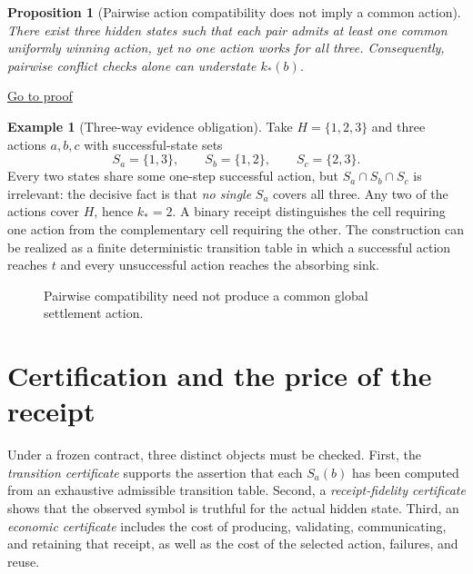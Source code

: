 \documentclass[11pt,letterpaper]{article}
\newtheorem{proposition}[theorem]{Proposition}
\theoremstyle{definition}
\newtheorem{example}[theorem]{Example}
\theoremstyle{remark}
\newcommand{\backproof}[1]{\hfill\hyperlink{proof:#1}{\footnotesize Go to proof}}
\begin{document}
\begin{proposition}[Pairwise action compatibility does not imply a common action]\label{prop:pair}\hypertarget{stmt:pair}{}
There exist three hidden states such that each pair admits at least one common uniformly winning action, yet no one action works for all three. Consequently, pairwise conflict checks alone can understate $k_*(b)$.
\end{proposition}\backproof{pair}

\begin{example}[Three-way evidence obligation]\label{ex:triad}
Take $H=\{1,2,3\}$ and three actions $a,b,c$ with successful-state sets
\[
 S_a=\{1,3\},\qquad S_b=\{1,2\},\qquad S_c=\{2,3\}.
\]
Every two states share some one-step successful action, but $S_a\cap S_b\cap S_c$ is irrelevant: the decisive fact is that \emph{no single} $S_a$ covers all three. Any two of the actions cover $H$, hence $k_*=2$. A binary receipt distinguishes the cell requiring one action from the complementary cell requiring the other. The construction can be realized as a finite deterministic transition table in which a successful action reaches $t$ and every unsuccessful action reaches the absorbing sink.
\end{example}

\begin{figure}[ht]
\centering{}
\caption{Pairwise compatibility need not produce a common global settlement action.}
\end{figure}

\section{Certification and the price of the receipt}
Under a frozen contract, three distinct objects must be checked. First, the \emph{transition certificate} supports the assertion that each $S_a(b)$ has been computed from an exhaustive admissible transition table. Second, a \emph{receipt-fidelity certificate} shows that the observed symbol is truthful for the actual hidden state. Third, an \emph{economic certificate} includes the cost of producing, validating, communicating, and retaining that receipt, as well as the cost of the selected action, failures, and reuse.
\end{document}

